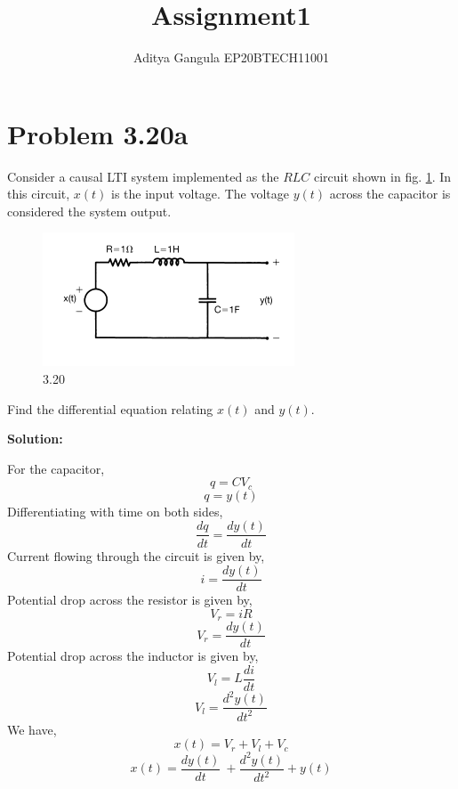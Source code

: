 \documentclass{article}
\title{Assignment1}
\author{Aditya Gangula EP20BTECH11001}
\begin{document}
\maketitle

\section*{Problem 3.20a}
Consider a causal LTI system implemented as the $RLC$ circuit shown in fig. \ref{prob}. In this circuit, $x(t)$ is the input voltage. The voltage $y(t)$ across the capacitor is considered the system output.
\begin{figure}[ht]
    \centering
    \includegraphics{probimg.png}
    \caption{3.20}
    \label{prob}
\end{figure}

\raggedright Find the differential equation relating $x(t)$ and $y(t)$.

\textbf {Solution:}

For the capacitor,
\[q = CV_c\]
\[ q = y(t)\]
Differentiating with time on both sides,
\[\frac{dq}{dt} = \frac{dy(t)}{dt}\]
Current flowing through the circuit is given by,
\[i = \frac{dy(t)}{dt}\]
Potential drop across the resistor is given by,
\[V_r = iR\]
\[V_r = \frac{dy(t)}{dt}\]
Potential drop across the inductor is given by,
\[V_l = L\frac{di}{dt}\]
\[V_l = \frac{d^2y(t)}{dt^2}\]
We have,
\[x(t) = V_r + V_l + V_c\]
\[x(t) = \frac{dy(t)}{dt}\ + \frac{d^2y(t)}{dt^2} + y(t)\]
\end{document}
